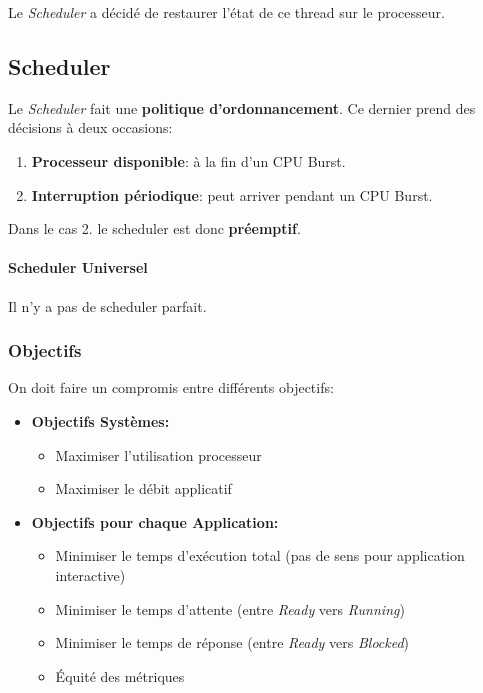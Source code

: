 Le \emph{Scheduler} a décidé de restaurer l'état de ce thread sur le
processeur.

\subsection{Scheduler}\label{scheduler}

Le \emph{Scheduler} fait une \textbf{politique d'ordonnancement}. Ce
dernier prend des décisions à deux occasions:

\begin{enumerate}
\def\labelenumi{\arabic{enumi}.}
\tightlist
\item
  \textbf{Processeur disponible}: à la fin d'un CPU Burst.
\item
  \textbf{Interruption périodique}: peut arriver pendant un CPU Burst.
\end{enumerate}

Dans le cas 2. le scheduler est donc \textbf{préemptif}.

\paragraph{Scheduler Universel}\label{scheduler-universel}

Il n'y a pas de scheduler parfait.

\subsubsection{Objectifs}\label{objectifs}

On doit faire un compromis entre différents objectifs:

\begin{itemize}
\tightlist
\item
  \textbf{Objectifs Systèmes:}

  \begin{itemize}
  \tightlist
  \item
    Maximiser l'utilisation processeur
  \item
    Maximiser le débit applicatif
  \end{itemize}
\item
  \textbf{Objectifs pour chaque Application:}

  \begin{itemize}
  \tightlist
  \item
    Minimiser le temps d'exécution total (pas de sens pour application
    interactive)
  \item
    Minimiser le temps d'attente (entre \emph{Ready} vers
    \emph{Running})
  \item
    Minimiser le temps de réponse (entre \emph{Ready} vers
    \emph{Blocked})
  \item
    Équité des métriques
  \end{itemize}
\end{itemize}

